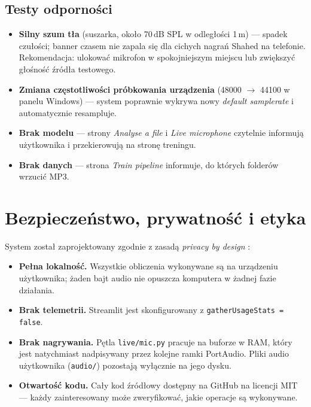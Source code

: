\documentclass[11pt,a4paper]{article}
\begin{document}
\subsection{Testy odporności}

\begin{itemize}[noitemsep]
  \item \textbf{Silny szum tła} (suszarka, około 70\,dB SPL w odległości 1\,m)
        --- spadek czułości; banner czasem nie zapala się dla cichych nagrań
        Shahed na telefonie. Rekomendacja: ulokować mikrofon w spokojniejszym
        miejscu lub zwiększyć głośność źródła testowego.
  \item \textbf{Zmiana częstotliwości próbkowania urządzenia} (48000 $\to$
        44100 w panelu Windows) --- system poprawnie wykrywa nowy
        \emph{default samplerate} i automatycznie resampluje.
  \item \textbf{Brak modelu} --- strony \emph{Analyse a file} i \emph{Live
        microphone} czytelnie informują użytkownika i przekierowują na
        stronę treningu.
  \item \textbf{Brak danych} --- strona \emph{Train pipeline} informuje, do
        których folderów wrzucić MP3.
\end{itemize}

\section{Bezpieczeństwo, prywatność i etyka}
\label{sec:bezpieczenstwo}

System został zaprojektowany zgodnie z zasadą \emph{privacy by design}
\cite{privacy_by_design}:
\begin{itemize}[noitemsep]
  \item \textbf{Pełna lokalność.} Wszystkie obliczenia wykonywane są na
        urządzeniu użytkownika; żaden bajt audio nie opuszcza komputera
        w żadnej fazie działania.
  \item \textbf{Brak telemetrii.} Streamlit jest skonfigurowany z
        \texttt{gatherUsageStats = false}.
  \item \textbf{Brak nagrywania.} Pętla \texttt{live/mic.py} pracuje na
        buforze w RAM, który jest natychmiast nadpisywany przez kolejne
        ramki PortAudio. Pliki audio użytkownika (\texttt{audio/}) pozostają
        wyłącznie na jego dysku.
  \item \textbf{Otwartość kodu.} Cały kod źródłowy dostępny na GitHub
        \cite{repo} na licencji MIT --- każdy zainteresowany może
        zweryfikować, jakie operacje są wykonywane.
\end{itemize}
\end{document}

